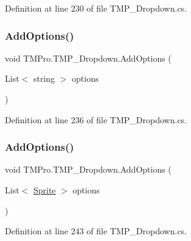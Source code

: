Definition at line 230 of file T\+M\+P\+\_\+\+Dropdown.\+cs.

\mbox{\label{class_t_m_pro_1_1_t_m_p___dropdown_afedde3cc300c5e96287f0e9d8731e34d}} 
\subsubsection{\texorpdfstring{AddOptions()}{AddOptions()}\hspace{0.1cm}{\footnotesize\ttfamily [2/3]}}
{\footnotesize\ttfamily void T\+M\+Pro.\+T\+M\+P\+\_\+\+Dropdown.\+Add\+Options (\begin{DoxyParamCaption}\item[{List$<$ string $>$}]{options }\end{DoxyParamCaption})}



Definition at line 236 of file T\+M\+P\+\_\+\+Dropdown.\+cs.

\mbox{\label{class_t_m_pro_1_1_t_m_p___dropdown_a369717c09b1e1fa94f5e7dfa19ae9c1f}} 
\subsubsection{\texorpdfstring{AddOptions()}{AddOptions()}\hspace{0.1cm}{\footnotesize\ttfamily [3/3]}}
{\footnotesize\ttfamily void T\+M\+Pro.\+T\+M\+P\+\_\+\+Dropdown.\+Add\+Options (\begin{DoxyParamCaption}\item[{List$<$ \mbox{\hyperlink{namespace_t_m_pro_ab5662f47179bf1b81c575ecf80b24065a51f2b7b14433aa22c67d1f4fc18943cd}{Sprite}} $>$}]{options }\end{DoxyParamCaption})}



Definition at line 243 of file T\+M\+P\+\_\+\+Dropdown.\+cs.

\mbox{\label{class_t_m_pro_1_1_t_m_p___dropdown_a9f434a91461de7a9b709bce0a4f31bd7}} 
